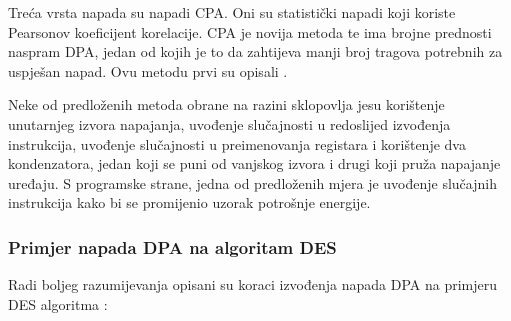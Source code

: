 \documentclass[times, utf8, diplomski]{fer}
\begin{document}
Treća vrsta napada su napadi CPA. Oni su statistički napadi koji koriste Pearsonov koeficijent korelacije. CPA je novija metoda te ima brojne prednosti naspram DPA, jedan od kojih je to da zahtijeva manji broj tragova potrebnih za uspješan napad. Ovu metodu prvi su opisali \cite{brier2004correlation}.

Neke od predloženih metoda obrane na razini sklopovlja jesu korištenje unutarnjeg izvora napajanja, uvođenje slučajnosti u redoslijed izvođenja instrukcija, uvođenje slučajnosti u preimenovanja registara i korištenje dva kondenzatora, jedan koji se puni od vanjskog izvora i drugi koji pruža napajanje uređaju. S programske strane, jedna od predloženih mjera je uvođenje slučajnih instrukcija kako bi se promijenio uzorak potrošnje energije.

\subsubsection{Primjer napada DPA na algoritam DES}

Radi boljeg razumijevanja opisani su koraci izvođenja napada DPA na primjeru DES algoritma \citep{standaert2010introduction}:
\end{document}

